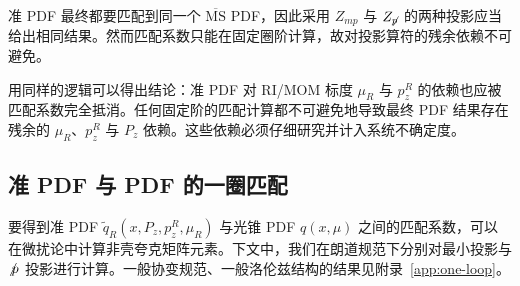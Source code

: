 准 PDF 最终都要匹配到同一个 $\overline{\text{MS}}$ PDF，因此采用 $Z_{mp}$ 与 $Z_{\slashed p}$ 的两种投影应当给出相同结果。然而匹配系数只能在固定圈阶计算，故对投影算符的残余依赖不可避免。

用同样的逻辑可以得出结论：准 PDF 对 RI/MOM 标度 $\mu_R$ 与 $p_z^R$ 的依赖也应被匹配系数完全抵消。任何固定阶的匹配计算都不可避免地导致最终 PDF 结果存在残余的 $\mu_R$、$p_z^R$ 与 $P_z$ 依赖。这些依赖必须仔细研究并计入系统不确定度。

\subsection{准 PDF 与 PDF 的一圈匹配}\label{sec:one_loop_matching}

要得到准 PDF $\widetilde{q}_R(x,P_z, p^R_z,\mu_R)$ 与光锥 PDF $q(x,\mu)$ 之间的匹配系数，可以在微扰论中计算非壳夸克矩阵元素。下文中，我们在朗道规范下分别对最小投影与 $\slashed p$ 投影进行计算。一般协变规范、一般洛伦兹结构的结果见附录~\ref{app:one-loop}。

